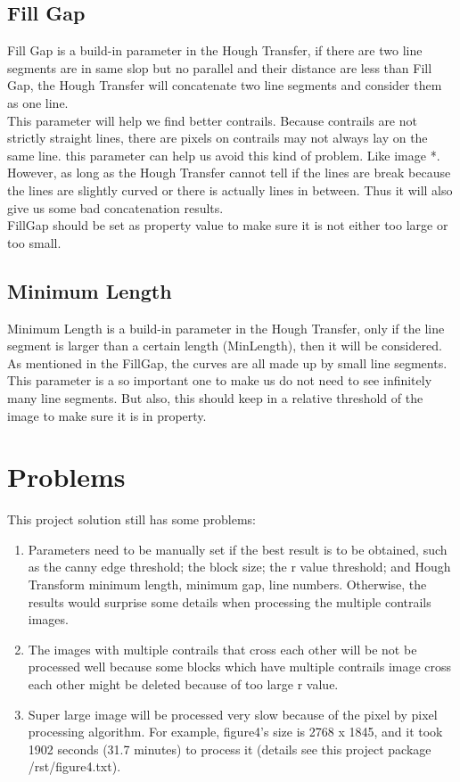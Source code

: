 \subsection{Fill Gap}
Fill Gap is a build-in parameter in the Hough Transfer, if there are two line segments are in same slop but no parallel and their distance are less than Fill Gap, the Hough Transfer will concatenate two line segments and consider them as one line.\\
This parameter will help we find better contrails. Because contrails are not strictly straight lines, there are pixels on contrails may not always lay on the same line. this parameter can help us avoid this kind of problem. Like image *.\\
However, as long as the Hough Transfer cannot tell if the lines are break because the lines are slightly curved or there is actually lines in between. Thus it will also give us some bad concatenation results. \\
FillGap should be set as property value to make sure it is not either too large or too small.


\subsection{Minimum Length}

Minimum Length is a build-in parameter in the Hough Transfer, only if the line segment is larger than a certain length (MinLength), then it will be considered. \\
As mentioned in the FillGap, the curves are all made up by small line segments. This parameter is a so important one to make us do not need to see infinitely many line segments. But also, this should keep in a relative threshold of the image to make sure it is in property.


\section{Problems}

This project solution still has some problems:
\begin{enumerate}
\item Parameters need to be manually set if the best result is to be obtained, such as the canny edge threshold; the block size; the r value threshold; and Hough Transform minimum length, minimum gap, line numbers. Otherwise, the results would surprise some details when processing the multiple contrails images.
\item The images with multiple contrails that cross each other will be not be processed well because some blocks which have multiple contrails image cross each other might be deleted because of too large r value.
\item Super large image will be processed very slow because of the pixel by pixel processing algorithm. For example, figure4’s size is 2768 x 1845, and it took 1902 seconds (31.7 minutes) to process it (details see this project package /rst/figure4.txt). 
\end{enumerate}
